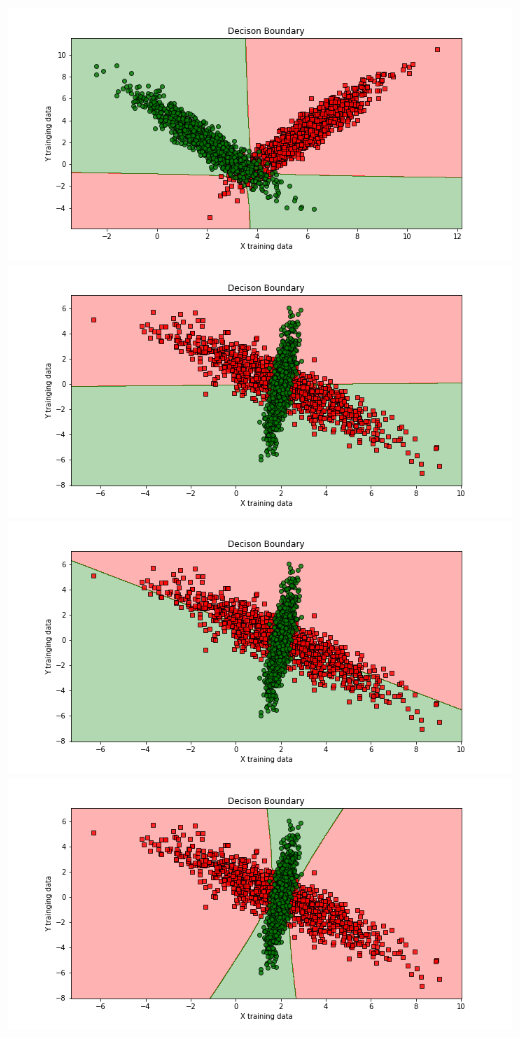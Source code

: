 \documentclass[solution,addpoints,12pt]{exam}
\begin{document}
\begin{questions}
\begin{parts}
\includegraphics[scale = 0.75]{image_3.png} \\ 
\includegraphics[scale = 0.75]{image_4.png} \\ 
\includegraphics[scale = 0.75]{image_5.png} \\ 
\includegraphics[scale = 0.75]{image_6.png}


\end{parts}
\end{questions}
\end{document}
